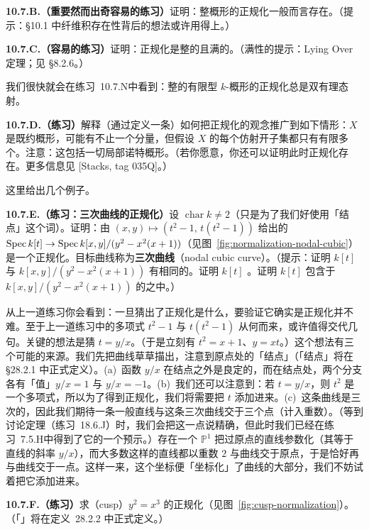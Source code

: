 \textbf{10.7.B.（重要然而出奇容易的练习）}\quad 证明：整概形的正规化一般而言存在。（提示：\S10.1 中纤维积存在性背后的想法或许用得上。）

\textbf{10.7.C.（容易的练习）}\quad 证明：正规化是整的且满的。（满性的提示：Lying Over 定理；见 \S8.2.6。）

我们很快就会在\mbox{练习~10.7.N}中看到：整的有限型 $k$-概形的正规化总是双有理态射。

\textbf{10.7.D.（练习）}\quad 解释（通过定义一条\trUniversalProperty）如何把正规化的观念推广到如下情形：$X$ 是既约概形，可能有不止一个分量，但假设 $X$ 的每个仿射开子集都只有有限多个\trIrreducibleComponent。注意：这包括一切局部诺特概形。（若你愿意，你还可以证明此时正规化存在。更多信息见 [Stacks, tag 035Q]。）

这里给出几个例子。

\textbf{10.7.E.（练习：\trNode{}三次曲线的正规化）}\quad 设 $\operatorname{char}k\neq 2$（只是为了我们好使用「结点」这个词）。证明：由 $(x,y)\mapsto(t^2-1,\,t(t^2-1))$ 给出的 $\operatorname{Spec} k[t]\to\operatorname{Spec} k[x,y]/(y^2-x^2(x+1))$（见图~\ref{fig:normalization-nodal-cubic}）是一个正规化。目标曲线称为\textbf{\trNode{}三次曲线}（nodal cubic curve）。（提示：证明 $k[t]$ 与 $k[x,y]/(y^2-x^2(x+1))$ 有相同的\trFractionField。证明 $k[t]$ \trIntegrallyClosed。证明 $k[t]$ 包含于 $k[x,y]/(y^2-x^2(x+1))$ 的\trIntegralClosure{}之中。）

从上一道练习你会看到：一旦猜出了正规化是什么，要验证它确实是正规化并不难。至于上一道练习中的多项式 $t^2-1$ 与 $t(t^2-1)$ 从何而来，或许值得交代几句。关键的想法是猜 $t=y/x$。（于是立刻有 $t^2=x+1$、$y=xt$。）这个想法有三个可能的来源。我们先把曲线草草描出，注意到原点处的「结点」（「结点」将在 \S28.2.1 中正式定义）。(a)~函数 $y/x$ 在结点之外是良定的，而在结点处，两个分支各有「值」$y/x=1$ 与 $y/x=-1$。(b)~我们还可以注意到：若 $t=y/x$，则 $t^2$ 是一个多项式，所以为了得到正规化，我们将需要把 $t$ 添加进来。(c)~这条曲线是三次的，因此我们期待一条一般直线与这条三次曲线交于三个点（计入重数）。（等到讨论\trBezout{}定理（\mbox{练习~18.6.J}）时，我们会把这一点说精确，但此时我们已经在\mbox{练习~7.5.H}中得到了它的一个预示。）存在一个 $\mathbb{P}^1$ 把过原点的直线参数化（其\trCoordinate{}等于直线的斜率 $y/x$），而大多数这样的直线都以重数 $2$ 与曲线交于原点，于是恰好再与曲线交于一点。这样一来，这个坐标便「坐标化」了曲线的大部分，我们不妨试着把它添加进来。

\textbf{10.7.F.（练习）}\quad 求\trCusp{}（cusp）$y^2=x^3$ 的正规化（见图~\ref{fig:cusp-normalization}）。（「\trCusp{}」将在定义~28.2.2 中正式定义。）


